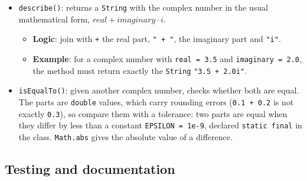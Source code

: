 \begin{enumerate}
\begin{itemize}
\begin{itemize}
                    \item By a real number \(k\): \((a + bi) \cdot k = ak + bki\).

                    \item By a complex number: \((a + bi)(c + di) = (ac - bd) + (ad + bc)i\), since \(i^2 = -1\).

                \end{itemize}

            \item \texttt{describe()}: returns a \texttt{String} with the complex number in the usual mathematical form, \(real + imaginary \cdot i\).

                \begin{itemize}

                    \item \textbf{Logic}: join with \texttt{+} the real part, \texttt{" + "}, the imaginary part and \texttt{"i"}.

                    \item \textbf{Example}: for a complex number with \texttt{real = 3.5} and \texttt{imaginary = 2.0}, the method must return exactly the \texttt{String} \texttt{"3.5 + 2.0i"}.

                \end{itemize}

            \item \texttt{isEqualTo()}: given another complex number, checks whether both are equal. The parts are \texttt{double} values, which carry rounding errors (\texttt{0.1 + 0.2} is not exactly \texttt{0.3}), so compare them with a tolerance: two parts are equal when they differ by less than a constant \texttt{EPSILON = 1e-9}, declared \texttt{static final} in the class. \texttt{Math.abs} gives the absolute value of a difference.

        \end{itemize}

\end{enumerate}

\subsection{Testing and documentation}

